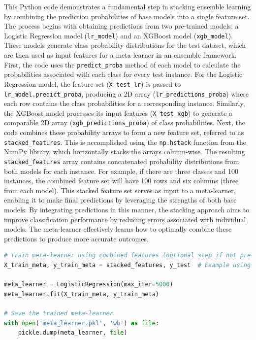 \noindent
This Python code demonstrates a fundamental step in stacking ensemble learning by combining the prediction probabilities of base models into a single feature set. The process begins with obtaining predictions from two pre-trained models: a Logistic Regression model (\texttt{lr\_model}) and an XGBoost model (\texttt{xgb\_model}). These models generate class probability distributions for the test dataset, which are then used as input features for a meta-learner in an ensemble framework. First, the code uses the \texttt{predict\_proba} method of each model to calculate the probabilities associated with each class for every test instance. For the Logistic Regression model, the feature set (\texttt{X\_test\_lr}) is passed to \texttt{lr\_model.predict\_proba}, producing a 2D array (\texttt{lr\_predictions\_proba}) where each row contains the class probabilities for a corresponding instance. Similarly, the XGBoost model processes its input features (\texttt{X\_test\_xgb}) to generate a comparable 2D array (\texttt{xgb\_predictions\_proba}) of class probabilities. Next, the code combines these probability arrays to form a new feature set, referred to as \texttt{stacked\_features}. This is accomplished using the \texttt{np.hstack} function from the NumPy library, which horizontally stacks the arrays column-wise. The resulting \texttt{stacked\_features} array contains concatenated probability distributions from both models for each instance. For example, if there are three classes and 100 instances, the combined feature set will have 100 rows and six columns (three from each model). This stacked feature set serves as input to a meta-learner, enabling it to make final predictions by leveraging the strengths of both base models. By integrating predictions in this manner, the stacking approach aims to improve classification performance by reducing errors associated with individual models. The meta-learner effectively learns how to optimally combine these predictions to produce more accurate outcomes.
    
\begin{tcolorbox}[colback=gray!5!white, colframe=gray!80!black, boxrule=0.5pt, title=Train Meta-Learner]
\begin{lstlisting}[language=Python]
# Train meta-learner using combined features (optional step if not pre-trained)
X_train_meta, y_train_meta = stacked_features, y_test  # Example using test data as meta-training data

meta_learner = LogisticRegression(max_iter=5000)
meta_learner.fit(X_train_meta, y_train_meta)

# Save the trained meta-learner
with open('meta_learner.pkl', 'wb') as file:
    pickle.dump(meta_learner, file)
\end{lstlisting}
\end{tcolorbox}

